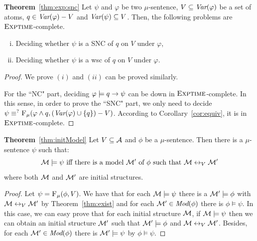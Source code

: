 \documentclass[runningheads]{llncs}
\begin{document}
\noindent\textbf{Theorem}~\ref{thm:exp:snc}
Let $\psi$ and $\varphi$ be two $\mu$-sentence, $V\subseteq \textit{Var}(\varphi)$ be a set of atoms, $q \in \textit{Var}(\varphi) - V$ and $\textit{Var}(\psi) \subseteq V$. Then, the following problems are $\textsc{Exptime}$-complete.
\begin{enumerate}[(i)]
    \item Deciding whether $\psi$ is a SNC of $q$ on $V$ under $\varphi$,
    \item Deciding whether $\psi$ is a wsc of $q$ on $V$ under $\varphi$.
\end{enumerate}
\begin{proof}
We prove $(i)$ and $(ii)$ can be proved similarly.

For the ``NC" part, deciding $\varphi \models q \rightarrow \psi$ can be down in $\textsc{Exptime}$-complete. In this sense, in order to prove the ``SNC" part, we only need to decide $\psi \equiv^? {\textsc{F}_{\textsc{$\mu$}}}(\varphi \wedge q, (\textit{Var}(\varphi) \cup \{q\}) - V)$. According to Corollary~\ref{cor:equiv}, it is in $\textsc{Exptime}$-complete.
\end{proof}



\noindent\textbf{Theorem}~\ref{thm:initModel}
Let $V \subseteq \cal A$ and $\phi$ be a $\mu$-sentence. Then there is a $\mu$-sentence $\psi$ such that:
\[
    \Hm \models \psi \mbox{ iff there is a model } \Hm'\mbox{ of } \phi \mbox{ such that } \Hm \lrto_V \Hm' %
\]
where both ${\cal M}$ and ${\cal M}'$ are initial structures.
\begin{proof}
Let $\psi={\textsc{F}_{\textsc{$\mu$}}}(\phi, V)$. We have that for each ${\cal M} \models \psi$ there is a ${\cal M}' \models \phi$ with ${\cal M} \leftrightarrow_V {\cal M}'$ by Theorem~\ref{thm:exist} and for each ${\cal M}' \in \textit{Mod}(\phi)$ there is $\phi \models \psi$.
In this case, we can easy prove that for each initial structure ${\cal M}$, if ${\cal M} \models \psi$ then we can obtain an initial structure ${\cal M}'$ such that ${\cal M}' \models \phi$ and ${\cal M} \leftrightarrow_V {\cal M}'$. Besides, for each ${\cal M}' \in \textit{Mod}(\phi)$ there is ${\cal M}' \models \psi$ by $\phi \models \psi$.
\end{proof}
\end{document}
